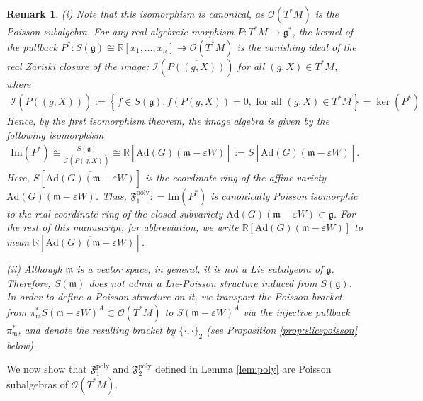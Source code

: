 \documentclass[11pt]{amsart}
\theoremstyle{definition}
\theoremstyle{plain}
\newtheorem{remark}[theorem]{Remark}
\theoremstyle{conclusion}
\begin{document}
 \begin{remark}
 \label{rem:ideal}
     (i) Note that this isomorphism is canonical, as $\mathcal{O}(T^*M)$ is the Poisson subalgebra.  For any real algebraic morphism $P : T^*M \rightarrow \mathfrak{g}^*$, the kernel of the pullback $P^*: S(\mathfrak{g}) \cong \mathbb{R}[x_1,\ldots,x_n] \twoheadrightarrow \mathcal{O}(T^*M)$ is the vanishing ideal of the real Zariski closure of the image: $\mathcal{I}(\overline{P((g,X))})$ for all $(g,X) \in T^*M$, where \begin{align*}
         \mathcal{I}(\overline{P((g,X))}) := \left\{ f\in S(\mathfrak{g}): f (P(g,X)) = 0,  \text{ for all } (g,X) \in T^*M \right\} = \ker (P^*)
     \end{align*} Hence, by the first isomorphism theorem, the image algebra is given by the following isomorphism \begin{align}
          \mathrm{Im} (P^*) \cong \frac{S(\mathfrak{g})}{\mathcal{I}(\overline{P(g,X)})} \cong \mathbb{R}[\overline{\mathrm{Ad}(G)(\mathfrak{m} - \varepsilon W)}] := S[\overline{\mathrm{Ad}(G)(\mathfrak{m} - \varepsilon W)}]. \label{eq:f1}
      \end{align} Here, $S[\overline{\mathrm{Ad}(G)(\mathfrak{m} - \varepsilon W)}]$ is the coordinate ring of the affine variety $\mathrm{Ad}(G)(\mathfrak{m} - \varepsilon W)$. Thus, $\mathfrak{F}_1^{\mathrm{poly}}: = \mathrm{Im} (P^*)$ is canonically Poisson isomorphic to the real coordinate ring of the closed subvariety $\overline{\mathrm{Ad}(G)(\mathfrak{m} - \varepsilon W)} \subset \mathfrak{g}$. For the rest of this manuscript, for abbreviation, we write $\mathbb{R}[ \mathrm{Ad}(G)(\mathfrak{m} - \varepsilon W)]$ to mean $\mathbb{R}[\overline{\mathrm{Ad}(G)(\mathfrak{m} - \varepsilon W)}]$.

      (ii) Although $\mathfrak{m}$ is a vector space, in general, it is not a Lie subalgebra of $\mathfrak{g}$. Therefore, $S(\mathfrak{m})$ does not admit a Lie-Poisson structure induced from $S(\mathfrak{g})$. In order to define a Poisson structure on it, we transport the Poisson bracket from $\pi_\mathfrak{m}^* S(\mathfrak{m}-\varepsilon W)^A\subset \mathcal{O}(T^* M)$ to $S(\mathfrak{m}-\varepsilon W)^A$ via the injective pullback $\pi_\mathfrak{m}^*$, and denote the resulting bracket by $\{\cdot,\cdot\}_2$ (see Proposition \ref{prop:slicepoisson} below).
 \end{remark}

We now show that $\mathfrak{F}_1^{\mathrm{poly}}$ and $\mathfrak{F}_2^{\mathrm{poly}}$ defined in Lemma \ref{lem:poly} are Poisson subalgebras of $\mathcal{O}(T^*M)$.
 
\end{document}
